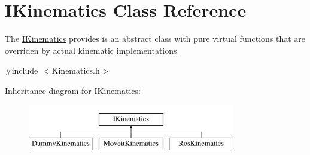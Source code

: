 \hypertarget{classIKinematics}{\section{I\-Kinematics Class Reference}
\label{classIKinematics}
}


The \hyperlink{classIKinematics}{I\-Kinematics} provides is an abstract class with pure virtual functions that are overriden by actual kinematic implementations.  




{\ttfamily \#include $<$Kinematics.\-h$>$}

Inheritance diagram for I\-Kinematics\-:\begin{figure}[H]
\begin{center}
\leavevmode
\includegraphics[height=2.000000cm]{classIKinematics}
\end{center}
\end{figure}

